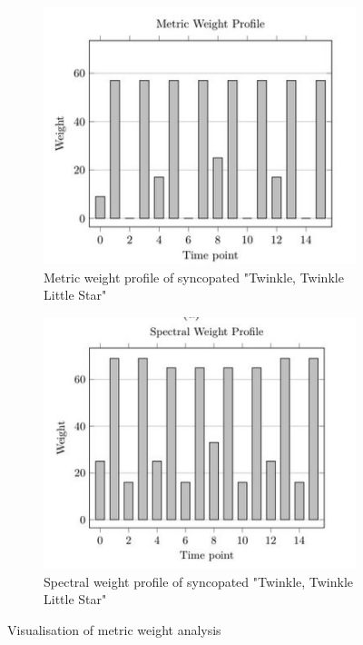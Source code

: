 \begin{figure}[H]
    \begin{subfigure}{0.45\textwidth}
        \centering
        \includegraphics[width=\linewidth]{IMAGES/IMA3.JPG}
        \caption{Metric weight profile of syncopated "Twinkle, Twinkle Little Star"}
        \label{fig:ima3}
    \end{subfigure}
    \begin{subfigure}{0.45\textwidth}
        \centering
        \includegraphics[width=\linewidth]{IMAGES/IMA4.JPG}
        \caption{Spectral weight profile of syncopated "Twinkle, Twinkle Little Star"}
        \label{fig:ima4}
    \end{subfigure}

    \caption{Visualisation of metric weight analysis \cite{Bemman2024}}
    \label{fig:ima_all}
\end{figure}


